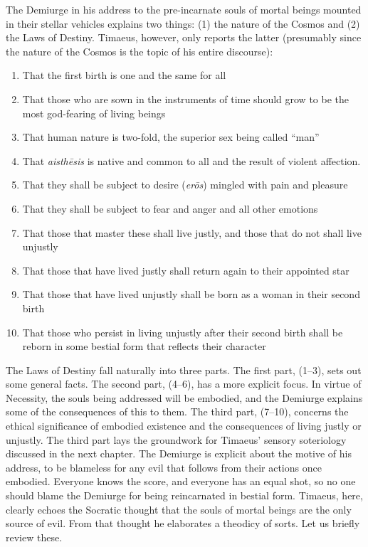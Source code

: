 The Demiurge in his address to the pre-incarnate souls of mortal beings mounted in their stellar vehicles explains two things: (1) the nature of the Cosmos and (2) the Laws of Destiny. Timaeus, however, only reports the latter (presumably since the nature of the Cosmos is the topic of his entire discourse):
\begin{enumerate}[(1)]
	\item That the first birth is one and the same for all
	\item That those who are sown in the instruments of time should grow to be the most god-fearing of living beings
	\item That human nature is two-fold, the superior sex being called ``man''
	\item That \emph{aisthēsis} is native and common to all and the result of violent affection.
	\item That they shall be subject to desire (\emph{erōs}) mingled with pain and pleasure
	\item That they shall be subject to fear and anger and all other emotions
	\item That those that master these shall live justly, and those that do not shall live unjustly
	\item That those that have lived justly shall return again to their appointed star
	\item That those that have lived unjustly shall be born as a woman in their second birth
	\item That those who persist in living unjustly after their second birth shall be reborn in some bestial form that reflects their character
\end{enumerate}
The Laws of Destiny fall naturally into three parts. The first part, (1--3), sets out some general facts. The second part, (4--6), has a more explicit focus. In virtue of Necessity, the souls being addressed will be embodied, and the Demiurge explains some of the consequences of this to them. The third part, (7--10), concerns the ethical significance of embodied existence and the consequences of living justly or unjustly. The third part lays the groundwork for Timaeus' sensory soteriology discussed in the next chapter. The Demiurge is explicit about the motive of his address, to be blameless for any evil that follows from their actions once embodied. Everyone knows the score, and everyone has an equal shot, so no one should blame the Demiurge for being reincarnated in bestial form. Timaeus, here, clearly echoes the Socratic thought that the souls of mortal beings are the only source of evil. From that thought he elaborates a theodicy of sorts. Let us briefly review these.


